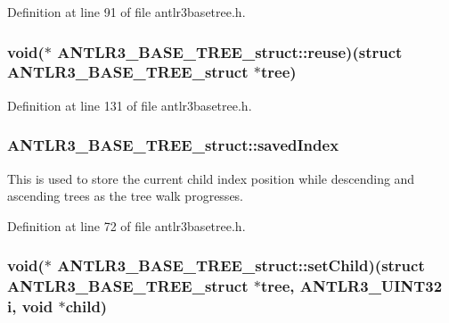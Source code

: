 Definition at line 91 of file antlr3basetree.\-h.

\hypertarget{struct_a_n_t_l_r3___b_a_s_e___t_r_e_e__struct_ad0d5c3a3cf21e9a5b2a38cccef396a74}{
\subsubsection[{reuse}]{\setlength{\rightskip}{0pt plus 5cm}void($\ast$ A\-N\-T\-L\-R3\-\_\-\-B\-A\-S\-E\-\_\-\-T\-R\-E\-E\-\_\-struct\-::reuse)(struct {\bf A\-N\-T\-L\-R3\-\_\-\-B\-A\-S\-E\-\_\-\-T\-R\-E\-E\-\_\-struct} $\ast$tree)}}\label{struct_a_n_t_l_r3___b_a_s_e___t_r_e_e__struct_ad0d5c3a3cf21e9a5b2a38cccef396a74}


Definition at line 131 of file antlr3basetree.\-h.

\hypertarget{struct_a_n_t_l_r3___b_a_s_e___t_r_e_e__struct_a8bd4e72792509a3c53a0178d3e4bf865}{
\subsubsection[{saved\-Index}]{ A\-N\-T\-L\-R3\-\_\-\-B\-A\-S\-E\-\_\-\-T\-R\-E\-E\-\_\-struct\-::saved\-Index}}\label{struct_a_n_t_l_r3___b_a_s_e___t_r_e_e__struct_a8bd4e72792509a3c53a0178d3e4bf865}
This is used to store the current child index position while descending and ascending trees as the tree walk progresses. 

Definition at line 72 of file antlr3basetree.\-h.

\hypertarget{struct_a_n_t_l_r3___b_a_s_e___t_r_e_e__struct_a291284e9247228f808bcbb86e3a85910}{
\subsubsection[{set\-Child}]{\setlength{\rightskip}{0pt plus 5cm}void($\ast$ A\-N\-T\-L\-R3\-\_\-\-B\-A\-S\-E\-\_\-\-T\-R\-E\-E\-\_\-struct\-::set\-Child)(struct {\bf A\-N\-T\-L\-R3\-\_\-\-B\-A\-S\-E\-\_\-\-T\-R\-E\-E\-\_\-struct} $\ast$tree, {\bf A\-N\-T\-L\-R3\-\_\-\-U\-I\-N\-T32} {\bf i}, void $\ast$child)}}\label{struct_a_n_t_l_r3___b_a_s_e___t_r_e_e__struct_a291284e9247228f808bcbb86e3a85910}


